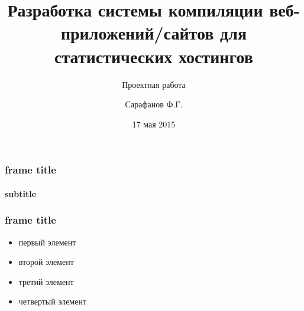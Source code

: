 \documentclass[10pt,pdf,hyperref={unicode}, aspectratio=1610]{beamer}
\title{Разработка системы компиляции веб-приложений/сайтов для статистических хостингов}
\subtitle{Проектная работа}
\author{Сарафанов Ф.Г.}
\date{17 мая 2015}
\begin{document}
\begin{frame}
\titlepage
\end{frame} 

\begin{frame}
\frametitle{frame title} 
\framesubtitle{subtitle}

\end{frame}

\begin{frame}
\frametitle{frame title} 
\begin{itemize}
\item<1-> первый элемент
\item<2-> второй элемент
\item<3-> третий элемент
\item<3-> четвертый элемент
\end{itemize}
\end{frame}
\end{document}
